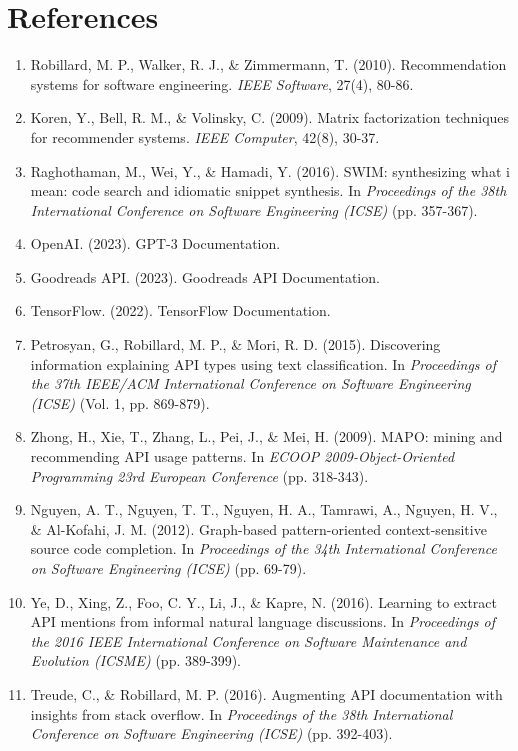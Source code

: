 \documentclass{article}
\begin{document}
\section*{References}

\begin{enumerate}
    \item Robillard, M. P., Walker, R. J., \& Zimmermann, T. (2010). Recommendation systems for software engineering. \textit{IEEE Software}, 27(4), 80-86.
    \item Koren, Y., Bell, R. M., \& Volinsky, C. (2009). Matrix factorization techniques for recommender systems. \textit{IEEE Computer}, 42(8), 30-37.
    \item Raghothaman, M., Wei, Y., \& Hamadi, Y. (2016). SWIM: synthesizing what i mean: code search and idiomatic snippet synthesis. In \textit{Proceedings of the 38th International Conference on Software Engineering (ICSE)} (pp. 357-367).
    \item OpenAI. (2023). GPT-3 Documentation.
    \item Goodreads API. (2023). Goodreads API Documentation.
    \item TensorFlow. (2022). TensorFlow Documentation.
    \item Petrosyan, G., Robillard, M. P., \& Mori, R. D. (2015). Discovering information explaining API types using text classification. In \textit{Proceedings of the 37th IEEE/ACM International Conference on Software Engineering (ICSE)} (Vol. 1, pp. 869-879).
    \item Zhong, H., Xie, T., Zhang, L., Pei, J., \& Mei, H. (2009). MAPO: mining and recommending API usage patterns. In \textit{ECOOP 2009-Object-Oriented Programming 23rd European Conference} (pp. 318-343).
    \item Nguyen, A. T., Nguyen, T. T., Nguyen, H. A., Tamrawi, A., Nguyen, H. V., \& Al-Kofahi, J. M. (2012). Graph-based pattern-oriented context-sensitive source code completion. In \textit{Proceedings of the 34th International Conference on Software Engineering (ICSE)} (pp. 69-79).
    \item Ye, D., Xing, Z., Foo, C. Y., Li, J., \& Kapre, N. (2016). Learning to extract API mentions from informal natural language discussions. In \textit{Proceedings of the 2016 IEEE International Conference on Software Maintenance and Evolution (ICSME)} (pp. 389-399).
    \item Treude, C., \& Robillard, M. P. (2016). Augmenting API documentation with insights from stack overflow. In \textit{Proceedings of the 38th International Conference on Software Engineering (ICSE)} (pp. 392-403).

\end{enumerate}
\end{document}
